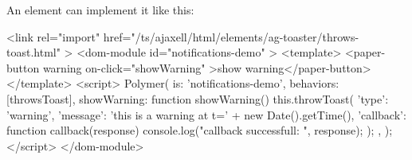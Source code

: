 An element can implement it like this:
\begin{pyglist}[language=html,numbers=left,numbersep=5pt,fontsize=\small]
<link rel="import" href="/ts/ajaxell/html/elements/ag-toaster/throws-toast.html" >
<dom-module id="notifications-demo" >
  <template>
    <paper-button warning on-click="showWarning" >show warning</paper-button>
  </template>
  <script>
    Polymer({
      is: 'notifications-demo',
      behaviors: [throwsToast],
      showWarning: function showWarning() {
        this.throwToast({
            'type': 'warning',
            'message': 'this is a warning at t=' + new Date().getTime(),
            'callback': function callback(response) {
                console.log("callback successfull: ", response);
            }
        });
      },
    });
  </script>
</dom-module>
\end{pyglist}
